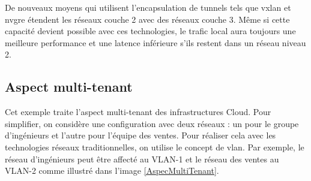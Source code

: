 
De nouveaux moyens qui utilisent l'encapsulation de tunnels tels que  \gls{vxlan} et \gls{nvgre} étendent les réseaux couche 2 avec des réseaux couche 3. Même si cette capacité devient possible avec ces technologies, le trafic local aura toujours une meilleure performance et une latence inférieure s'ils restent dans un réseau niveau 2. 
\cite{hpCloudEffectsOnNetworkChanging} \cite{vm7Challenges} \cite{zkCloudArrived}






\subsection{Aspect multi-tenant}

Cet exemple traite l'aspect multi-tenant des infrastructures Cloud. Pour simplifier, on considère une configuration avec deux réseaux : un pour le groupe d'ingénieurs et l'autre pour l'équipe des ventes. Pour réaliser cela avec les technologies réseaux traditionnelles, on utilise le concept de \gls{vlan}. Par exemple, le réseau d'ingénieurs peut être affecté au VLAN-1 et le réseau des ventes au VLAN-2 comme illustré dans l'image \ref{AspecMultiTenant}.



